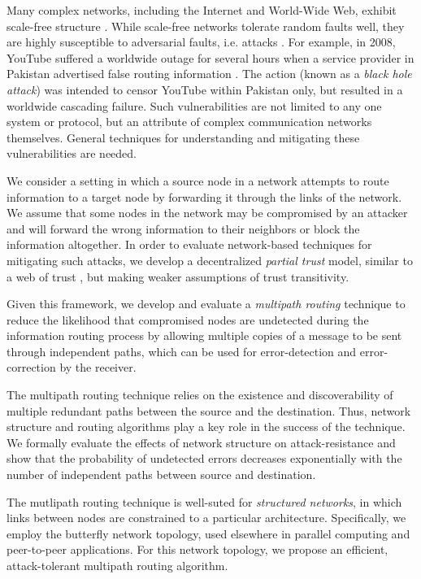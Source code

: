\documentclass[prodmode,permissions]{acmsmall-ec16}
\begin{document}
Many complex networks, including the Internet and World-Wide Web, exhibit
scale-free structure
\cite{barabasi_emergence_1999,barabasi_scale-free_2009}.
While scale-free networks tolerate random faults well,
they are highly susceptible to adversarial faults, i.e. attacks
\cite{albert_error_2000}.
For example, in 2008, YouTube suffered a worldwide outage for several hours
when a service provider in Pakistan advertised false routing information
\cite{hunter_pakistan_2008}.
The action (known as a {\em black hole attack}) was intended to censor YouTube
within Pakistan only, but resulted in a worldwide cascading failure.
Such vulnerabilities are not limited to any one system or protocol, but an
attribute of complex communication networks themselves.
General techniques for understanding and mitigating these vulnerabilities are
needed.

We consider a setting in which a source node in a network attempts to route information
to a target node by forwarding it through the links of the network. We 
assume that some nodes in the network may be compromised by an attacker 
and will forward the wrong information to their neighbors or
block the information altogether.
In order to evaluate network-based techniques for mitigating such attacks,
we develop a decentralized {\em partial trust} model,
similar to a web of trust
\cite{zimmermann_official_1995,ferguson_practical_2003},
but making weaker assumptions of trust transitivity.

Given this framework, we develop and evaluate a \emph{multipath routing} technique to reduce 
the likelihood that compromised nodes are undetected during the information 
routing process by allowing multiple copies of a message to be sent through independent paths,
which can be used for error-detection and error-correction by the receiver. 

The multipath routing technique relies on the existence and discoverability of
multiple redundant paths between the source and the destination. Thus, network 
structure and routing algorithms play a key role in the success of the technique.
We formally evaluate the 
effects of network structure on attack-resistance and show that the probability
of undetected 
errors decreases exponentially with the number of independent paths between 
source and destination.

The mutlipath routing technique is well-suted for {\em structured networks},
in which links between nodes are constrained to a particular architecture.
Specifically, we employ the butterfly network topology,
used elsewhere in parallel computing \cite{kshemkalyani_distributed_2008}
and peer-to-peer \cite{lua_survey_2005, korzun_structured_2013}
applications.
For this network topology,
we propose an efficient, attack-tolerant multipath routing algorithm.
\end{document}
